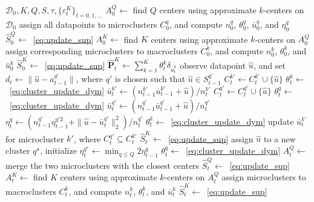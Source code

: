 \documentclass[12pt]{article}
\newcommand{\unc}{u}
\newcommand{\eps}{\varepsilon^K}
\newcommand{\RC}[1]{\textcolor{black}{#1}}
\newcommand{\RC}[1]{\textcolor{blue}{#1}}
\begin{document}
\begin{algorithm}[ht]
\caption{OnlineClustering}\label{alg:online_cluster}
	\begin{algorithmic}[1]
	  $\mathcal{D}_0, K, Q, S,\tau, \{\eps_t\}_{t=0,1,\dots}$
     \State $A^Q_0 \gets$ find $Q$ centers using approximate $k$-centers on $\mathcal{D}_0$
     \State assign all datapoints to microclusters $C^q_0$, and compute $n^q_0$, $\theta^q_0$, $\bar{u}_0^q$, and $\eta^q_0$
     \State $\hat{S}^Q_{0} \gets $~\eqref{eq:update_sup}
     \State $A^K_0 \gets$ find $K$ centers using approximate $k$-centers on $A^Q_0$
     \State assign corresponding microclusters to macroclusters $C^k_0$, and compute $n^k_0$, $\theta^k_0$, and $\bar{u}_0^k$
     \State $\hat{S}^K_{0}\gets $~\eqref{eq:update_sup}
     \State  $\hat{\mathbf{P}}^K_{t} \gets \sum_{k=1}^{K}\theta_t^k\delta_{\bar{u}_t^k}$
    \State observe datapoint $\hat{\unc}$, and set $d_t \gets \|\hat{u} - a^{q'}_{t-1}\|$, where $q'$ is chosen such that $\hat{u} \in S^{q'}_{t-1}$
    \State $C_t^{k'} \gets C_t^{k'} \cup \{\hat{u}\}$ 
     \State $\theta^k_t\gets$~\eqref{eq:cluster_update_dym} 
    \State $\bar{u}^{k'}_t \gets (n^{k'}_{t-1}\bar{u}^{k'}_{t-1} + \hat{u})/n^{k'}_t$ \Comment{update \RC{mean}}
    \State $C_t^{q'} \gets C_t^{q'} \cup \{\hat{u}\}$
    \State $\theta^q_t\gets$~\eqref{eq:cluster_update_dym} 
    \State $\bar{u}^{q'}_t \gets (n^{q'}_{t-1}\bar{u}^{q'}_{t-1} + \hat{u})/n^{q'}_t$\Comment{update \RC{mean}}
     \State $\eta^{q}_t \gets (n^{q'}_{t-1}\eta^{q'2}_{t-1} + \|\hat{u}-\bar{u}^{q'}_t\|_2^2 )/n^{q'}_t$
    \State $\theta^k_t\gets$~\eqref{eq:cluster_update_dym} 
    \State update $\bar{u}^{k'}_t$ for microcluster $k'$, where $C^{q'}_t \subseteq C^{k'}_t$
    \State $\hat{S}^K_{t}\gets $~\eqref{eq:update_sup}
    \Else
    \State assign $\hat{u}$ to a new cluster $q^\star$, initialize $\eta^{q^\star}_t \gets \min_{q\leq Q}2\eta^q_{t-1}$
    \State $\theta^q_t\gets$~\eqref{eq:cluster_update_dym} 
    \State $A^Q_t \gets$ merge the two microclusters with the closest centers 
    \State $\hat{S}^Q_{t}\gets $~\eqref{eq:update_sup}
   \State $A^K_t \gets$ find $K$ centers using approximate $k$-centers on $A^Q_t$
     \State assign microclusters to macroclusters $C^k_t$, and compute $n^k_t$, $\theta^k_t$, and $\bar{u}_t^k$
     \State $\hat{S}^K_{t}\gets $~\eqref{eq:update_sup}
    \EndIf
  \EndFor
	\end{algorithmic}
\end{algorithm} 

\fi


\ifpreprint
\else

\fi
\end{document}
